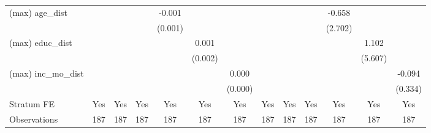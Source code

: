 {\begin{tabular}{l*{12}{c}}
(max) age\_dist  &                  &                  &                  &   -0.001         &                  &                  &                  &                  &                  &   -0.658         &                  &                  \\
                &                  &                  &                  &  (0.001)         &                  &                  &                  &                  &                  &  (2.702)         &                  &                  \\
(max) educ\_dist &                  &                  &                  &                  &    0.001         &                  &                  &                  &                  &                  &    1.102         &                  \\
                &                  &                  &                  &                  &  (0.002)         &                  &                  &                  &                  &                  &  (5.607)         &                  \\
(max) inc\_mo\_dist&                  &                  &                  &                  &                  &    0.000         &                  &                  &                  &                  &                  &   -0.094         \\
                &                  &                  &                  &                  &                  &  (0.000)         &                  &                  &                  &                  &                  &  (0.334)         \\
Stratum FE      &      Yes         &      Yes         &      Yes         &      Yes         &      Yes         &      Yes         &      Yes         &      Yes         &      Yes         &      Yes         &      Yes         &      Yes         \\
\hline
Observations    &      187         &      187         &      187         &      187         &      187         &      187         &      187         &      187         &      187         &      187         &      187         &      187         \\
\hline\hline
\end{tabular}
}
